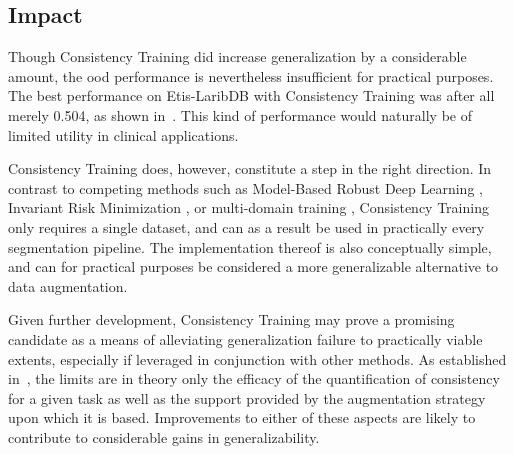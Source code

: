 

        
    \subsection{Impact}
    Though Consistency Training did increase generalization by a considerable amount, the \gls{ood} performance is nevertheless insufficient for practical purposes. The best performance on Etis-LaribDB with Consistency Training was after all merely 0.504, as shown in~. This kind of performance would naturally be of limited utility in clinical applications.
    
    Consistency Training does, however, constitute a step in the right direction. In contrast to competing methods such as Model-Based Robust Deep Learning \cite{modelbased}, Invariant Risk Minimization \cite{IRM}, or multi-domain training \cite{generalization_datamod}, Consistency Training only requires a single dataset, and can as a result be used in practically every segmentation pipeline. The implementation thereof is also conceptually simple, and can for practical purposes be considered a more generalizable alternative to data augmentation. 
    
    Given further development, Consistency Training may prove a promising candidate as a means of alleviating generalization failure to practically viable extents, especially if leveraged in conjunction with other methods. As established in~, the limits are in theory only the efficacy of the quantification of consistency for a given task as well as the support provided by the augmentation strategy upon which it is based. Improvements to either of these aspects are likely to contribute to considerable gains in generalizability. 
    
